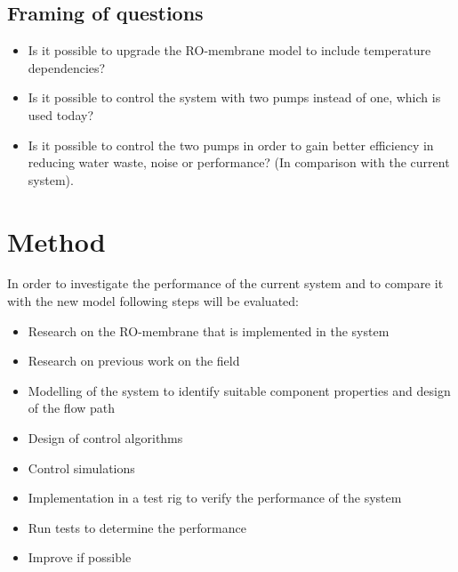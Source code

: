 \subsection{Framing of questions}
\label{framing}
\begin{itemize}
\renewcommand\labelitemi{-}
   \item Is it possible to upgrade the RO-membrane model to include temperature dependencies?
   \item Is it possible to control the system with two pumps instead of one, which is used today?
    \item Is it possible to control the two pumps in order to gain better efficiency in reducing water waste, noise or performance? (In comparison with the current system).   
\end{itemize}


\section{Method}

In order to investigate the performance of the current system and to compare it with the new model following steps will be evaluated:

\begin{itemize}
\renewcommand\labelitemi{-}
    \item Research on the RO-membrane that is implemented in the system  
    \item Research on previous work on the field
    \item Modelling of the system to identify suitable component properties and design of the flow path
    \item Design of control algorithms
    \item Control simulations
    \item Implementation in a test rig to verify the performance of the system
    \item Run tests to determine the performance
    \item Improve if possible
\end{itemize}




